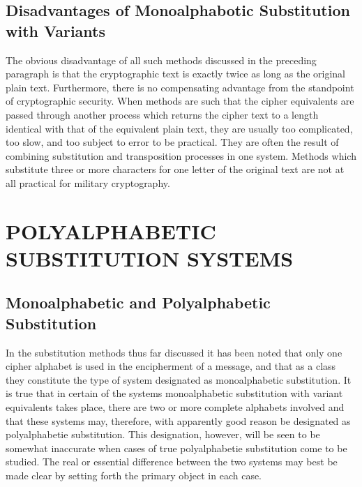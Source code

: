 \subsection{Disadvantages of Monoalphabotic Substitution with Variants}

The obvious disadvantage of all such methods discussed in the preceding paragraph is that the cryptographic text is exactly twice as long as
the original plain text. Furthermore, there is no compensating advantage
from the standpoint of cryptographic security. When methods are such
that the cipher equivalents are passed through another process which returns the cipher text to a length identical with that of the equivalent plain
text, they are usually too complicated, too slow, and too subject to error
to be practical. They are often the result of combining substitution and
transposition processes in one system. Methods which substitute three
or more characters for one letter of the original text are not at all practical for military cryptography.

\section{POLYALPHABETIC SUBSTITUTION SYSTEMS}

\subsection{Monoalphabetic and Polyalphabetic Substitution}

\mypara In the substitution methods thus far discussed it has been noted that
only one cipher alphabet is used in the encipherment of a message, and
that as a class they constitute the type of system designated as monoalphabetic substitution. It is true that in certain of the systems monoalphabetic substitution with variant equivalents takes place, there are two
or more complete alphabets involved and that these systems may, therefore, with apparently good reason be designated as polyalphabetie substitution. This designation, however, will be seen to be somewhat inaccurate when cases of true polyalphabetie substitution come to be studied.
The real or essential difference between the two systems may best be
made clear by setting forth the primary object in each case.

